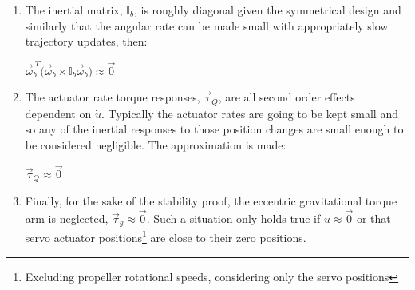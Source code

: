 \begin{enumerate}[itemsep=0em]
\item The inertial matrix, $\mathbb{I}_b$, is roughly diagonal given the symmetrical design and similarly that the angular rate can be made small with appropriately slow trajectory updates, then:
\begin{center}
\vspace{-10pt}
$\vec{\omega}_b^{~T}\big(\vec{\omega}_b\times\mathbb{I}_b\vec{\omega}_b\big)\approx\vec{0}$
\vspace{-8pt}
\end{center}
\item The actuator rate torque responses, $\vec{\tau}_Q$, are all second order effects dependent on $\dot{u}$. Typically the actuator rates are going to be kept small and so any of the inertial responses to those position changes are small enough to be considered negligible. The approximation is made:
\begin{center}
\vspace{-10pt}
$\vec{\tau}_Q\approx\vec{0}$
\vspace{-8pt}
\end{center}
\item Finally, for the sake of the stability proof, the eccentric gravitational torque arm is neglected, $\vec{\tau}_g\approx\vec{0}$. Such a situation only holds true if $u\approx\vec{0}$ or that servo actuator positions\footnote{Excluding propeller rotational speeds, considering only the servo positions} are close to their zero positions.
\end{enumerate}
